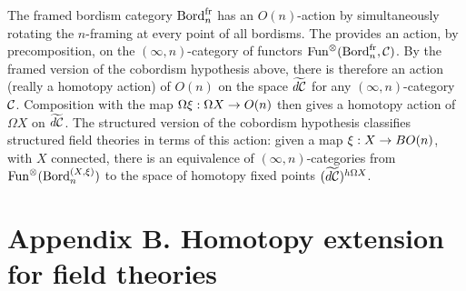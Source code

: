 \documentclass{amsart}
\begin{document}
The framed bordism category $\mathrm{Bord}^\mathrm{fr}_n$ has an $O(n)$-action by simultaneously rotating the $n$-framing at every point of all bordisms.  The provides an action, by precomposition, on the $(\infty,n)$-category of functors $\operatorname{Fun}^\otimes(\mathrm{Bord}^\mathrm{fr}_n,\mathcal C)$.  By the framed version of the cobordism hypothesis above, there is therefore an action (really a homotopy action) of $O(n)$ on the space $\widetilde{d\mathcal C}$ for any $(\infty,n)$-category $\mathcal C$.  Composition with the map $\Omega \xi: \Omega X \rightarrow O(n)$ then gives a homotopy action of $\Omega X$ on $\widetilde{d\mathcal C}$.  The structured version of the cobordism hypothesis classifies structured field theories in terms of this action: given a map $\xi: X \rightarrow BO(n)$, with $X$ connected, there is an equivalence of $(\infty,n)$-categories from $\operatorname{Fun}^\otimes(\mathrm{Bord}_n^{(X,\xi)})$ to the space of homotopy fixed points $(\widetilde{d\mathcal C})^{h\Omega X}$.


\renewcommand{\theapptheorem}{B.\arabic{apptheorem}}
\setcounter{apptheorem}{0}

\section*{Appendix B. Homotopy extension for field theories} \label{sec:Hom_ext_field_thy}

\end{document}
